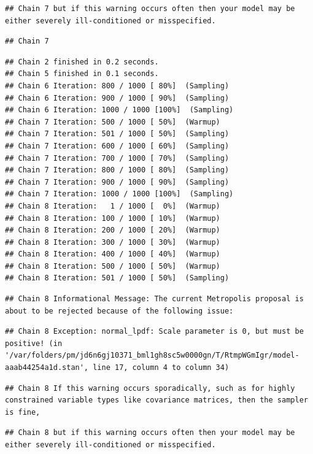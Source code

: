 \documentclass[
]{book}
\begin{document}
\begin{verbatim}
## Chain 7 but if this warning occurs often then your model may be either severely ill-conditioned or misspecified.
\end{verbatim}

\begin{verbatim}
## Chain 7
\end{verbatim}

\begin{verbatim}
## Chain 2 finished in 0.2 seconds.
## Chain 5 finished in 0.1 seconds.
## Chain 6 Iteration: 800 / 1000 [ 80%]  (Sampling) 
## Chain 6 Iteration: 900 / 1000 [ 90%]  (Sampling) 
## Chain 6 Iteration: 1000 / 1000 [100%]  (Sampling) 
## Chain 7 Iteration: 500 / 1000 [ 50%]  (Warmup) 
## Chain 7 Iteration: 501 / 1000 [ 50%]  (Sampling) 
## Chain 7 Iteration: 600 / 1000 [ 60%]  (Sampling) 
## Chain 7 Iteration: 700 / 1000 [ 70%]  (Sampling) 
## Chain 7 Iteration: 800 / 1000 [ 80%]  (Sampling) 
## Chain 7 Iteration: 900 / 1000 [ 90%]  (Sampling) 
## Chain 7 Iteration: 1000 / 1000 [100%]  (Sampling) 
## Chain 8 Iteration:   1 / 1000 [  0%]  (Warmup) 
## Chain 8 Iteration: 100 / 1000 [ 10%]  (Warmup) 
## Chain 8 Iteration: 200 / 1000 [ 20%]  (Warmup) 
## Chain 8 Iteration: 300 / 1000 [ 30%]  (Warmup) 
## Chain 8 Iteration: 400 / 1000 [ 40%]  (Warmup) 
## Chain 8 Iteration: 500 / 1000 [ 50%]  (Warmup) 
## Chain 8 Iteration: 501 / 1000 [ 50%]  (Sampling)
\end{verbatim}

\begin{verbatim}
## Chain 8 Informational Message: The current Metropolis proposal is about to be rejected because of the following issue:
\end{verbatim}

\begin{verbatim}
## Chain 8 Exception: normal_lpdf: Scale parameter is 0, but must be positive! (in '/var/folders/pm/jd6n6gj10371_bml1gh8sc5w0000gn/T/RtmpWGmIgr/model-aaab44254a1d.stan', line 17, column 4 to column 34)
\end{verbatim}

\begin{verbatim}
## Chain 8 If this warning occurs sporadically, such as for highly constrained variable types like covariance matrices, then the sampler is fine,
\end{verbatim}

\begin{verbatim}
## Chain 8 but if this warning occurs often then your model may be either severely ill-conditioned or misspecified.
\end{verbatim}
\end{document}
